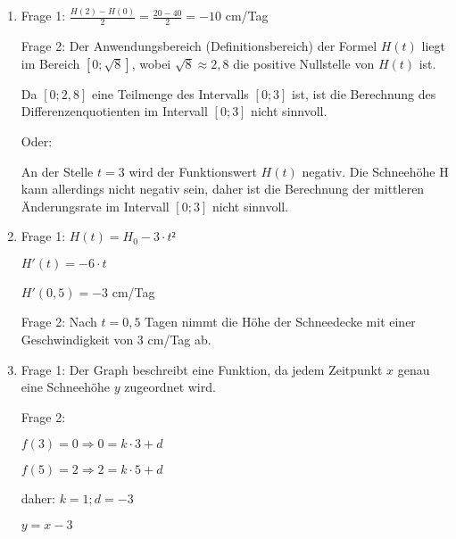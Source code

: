 \begin{langesbeispiel}
{\begin{enumerate}
	Frage 2: Je größer $a$, desto schneller nimmt die Schneehöhe ab!
	
	\item Frage 1: $\frac{H(2)-H(0)}{2}=\frac{20-40}{2}=-10$ cm/Tag
	
	Frage 2: Der Anwendungsbereich (Definitionsbereich) der Formel $H(t)$ liegt im Bereich $[0;\sqrt{8}]$, wobei $\sqrt{8}\approx 2,8$ die positive Nullstelle von $H(t)$ ist.
	
	Da $[0;2,8]$ eine Teilmenge des Intervalls $[0;3]$ ist, ist die Berechnung des Differenzenquotienten im Intervall $[0;3]$ nicht sinnvoll.
	
	Oder:
	
	An der Stelle $t=3$ wird der Funktionswert $H(t)$ negativ. Die Schneehöhe H kann allerdings nicht negativ sein, daher ist die Berechnung der mittleren Änderungsrate im Intervall $[0;3]$ nicht sinnvoll.
	\item Frage 1: $H(t)=H_0-3\cdot t²$
	
	$H'(t)=-6\cdot t$
	
	$H'(0,5)=-3$ cm/Tag
	
	Frage 2: Nach $t=0,5$ Tagen nimmt die Höhe der Schneedecke mit einer Geschwindigkeit von 3 cm/Tag ab.
	\item Frage 1: Der Graph beschreibt eine Funktion, da jedem Zeitpunkt $x$ genau eine Schneehöhe $y$ zugeordnet wird.
	
	Frage 2: 
	
	$f(3)=0\Rightarrow 0=k\cdot 3+d$
	
	$f(5)=2\Rightarrow 2=k\cdot 5+d$
	
	daher: $k=1; d=-3$
	
	$y=x-3$
	\end{enumerate}}
		\end{langesbeispiel}
